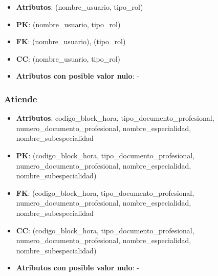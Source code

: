 \documentclass[a4paper,11pt]{article}
\begin{document}
\begin{itemize}

\item 
\textbf{Atributos}: (nombre\_usuario, tipo\_rol)

\item 
\textbf{PK}: (nombre\_usuario, tipo\_rol)

\item
\textbf{FK}: (nombre\_usuario), (tipo\_rol)

\item 
\textbf{CC}: (nombre\_usuario, tipo\_rol)

\item 
\textbf{Atributos con posible valor nulo}: -

\end{itemize}
\subsubsection{\textbf{Atiende}}

\begin{itemize}

\item 
\textbf{Atributos}: codigo\_block\_hora, 
 tipo\_documento\_profesional, numero\_documento\_profesional, nombre\_especialidad, nombre\_subespecialidad

\item 
\textbf{PK}: (codigo\_block\_hora, 
 tipo\_documento\_profesional, numero\_documento\_profesional, nombre\_especialidad, nombre\_subespecialidad)

\item
\textbf{FK}: (codigo\_block\_hora,
tipo\_documento\_profesional, numero\_documento\_profesional, nombre\_especialidad, nombre\_subespecialidad

\item 
\textbf{CC}: (codigo\_block\_hora,
tipo\_documento\_profesional, numero\_documento\_profesional,
nombre\_especialidad, nombre\_subespecialidad)

\item 
\textbf{Atributos con posible valor nulo}: -

\end{itemize}

\newpage
\end{document}
